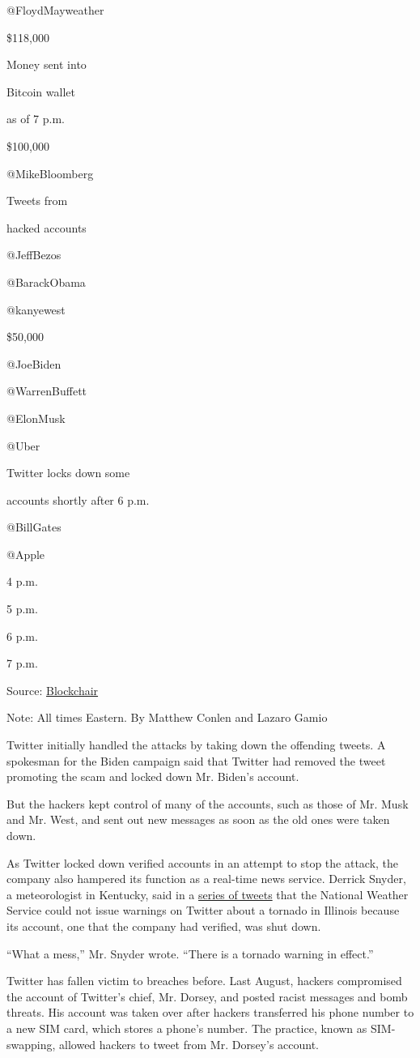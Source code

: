 @FloydMayweather

\$118,000

Money sent into

Bitcoin wallet

as of 7 p.m.

\$100,000

@MikeBloomberg

Tweets from

hacked accounts

@JeffBezos

@BarackObama

@kanyewest

\$50,000

@JoeBiden

@WarrenBuffett

@ElonMusk

@Uber

Twitter locks down some

accounts shortly after 6 p.m.

@BillGates

@Apple

4 p.m.

5 p.m.

6 p.m.

7 p.m.

Source: \href{https://blockchair.com/}{Blockchair}

Note: All times Eastern. By Matthew Conlen and Lazaro Gamio

Twitter initially handled the attacks by taking down the offending
tweets. A spokesman for the Biden campaign said that Twitter had removed
the tweet promoting the scam and locked down Mr. Biden's account.

But the hackers kept control of many of the accounts, such as those of
Mr. Musk and Mr. West, and sent out new messages as soon as the old ones
were taken down.

As Twitter locked down verified accounts in an attempt to stop the
attack, the company also hampered its function as a real-time news
service. Derrick Snyder, a meteorologist in Kentucky, said in a
\href{https://twitter.com/Derrick_Snyder/status/1283529433689792513}{series
of tweets} that the National Weather Service could not issue warnings on
Twitter about a tornado in Illinois because its account, one that the
company had verified, was shut down.

``What a mess,'' Mr. Snyder wrote. ``There is a tornado warning in
effect.''

Twitter has fallen victim to breaches before. Last August, hackers
compromised the account of Twitter's chief, Mr. Dorsey, and posted
racist messages and bomb threats. His account was taken over after
hackers transferred his phone number to a new SIM card, which stores a
phone's number. The practice, known as SIM-swapping, allowed hackers to
tweet from Mr. Dorsey's account.

